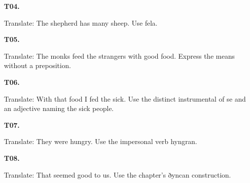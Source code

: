 \par\begin{minipage}{\linewidth}\raggedright
\textbf{T04.}

Translate: The shepherd has many sheep. Use fela.

\end{minipage}\par\addvspace{4pt}

\par\begin{minipage}{\linewidth}\raggedright
\textbf{T05.}

Translate: The monks feed the strangers with good food. Express the means without a preposition.

\end{minipage}\par\addvspace{4pt}

\par\begin{minipage}{\linewidth}\raggedright
\textbf{T06.}

Translate: With that food I fed the sick. Use the distinct instrumental of se and an adjective naming the sick people.

\end{minipage}\par\addvspace{4pt}

\par\begin{minipage}{\linewidth}\raggedright
\textbf{T07.}

Translate: They were hungry. Use the impersonal verb hyngran.

\end{minipage}\par\addvspace{4pt}

\par\begin{minipage}{\linewidth}\raggedright
\textbf{T08.}

Translate: That seemed good to us. Use the chapter’s ðyncan construction.

\end{minipage}\par\addvspace{4pt}

